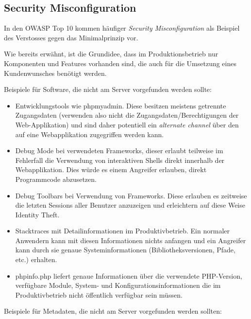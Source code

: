 \subsection{Security Misconfiguration}

In den OWASP Top 10 kommen häufiger \textit{Security Misconfiguration} als Beispiel des Verstosses gegen das Minimalprinzip vor.

Wie bereits erwähnt, ist die Grundidee, dass im Produktionsbetrieb nur Komponenten und Features vorhanden sind, die auch für die Umsetzung eines Kundenwunsches benötigt werden.

Beispiele für Software, die nicht am Server vorgefunden werden sollte:

\begin{itemize}
	\item Entwicklungstools wie phpmyadmin. Diese besitzen meistens getrennte Zugangsdaten (verwenden also nicht die Zugangsdaten/Berechtigungen der Web-Applikation) und sind daher potentiell ein \textit{alternate channel} über den auf eine Webapplikation zugegriffen werden kann.
	\item Debug Mode bei verwendeten Frameworks, dieser erlaubt teilweise im Fehlerfall die Verwendung von interaktiven Shells direkt innerhalb der Webapplikation. Dies würde es einem Angreifer erlauben, direkt Programmcode abzusetzen.
	\item Debug Toolbars bei Verwendung von Frameworks. Diese erlauben es zeitweise die letzten Sessions aller Benutzer anzuzeigen und erleichtern auf diese Weise Identity Theft.
	\item Stacktraces mit Detailinformationen im Produktivbetrieb. Ein normaler Anwendern kann mit diesen Informationen nichts anfangen und ein Angreifer kann durch sie genaue Systeminformationen (Bibliotheksversionen, Pfade, etc.) erhalten.
	\item phpinfo.php liefert genaue Informationen über die verwendete PHP-Version, verfügbare Module, System- und Konfigurationsinformationen die im Produktivbetrieb nicht öffentlich verfügbar sein müssen.
\end{itemize}

Beispiele für Metadaten, die nicht am Server vorgefunden werden sollten:

